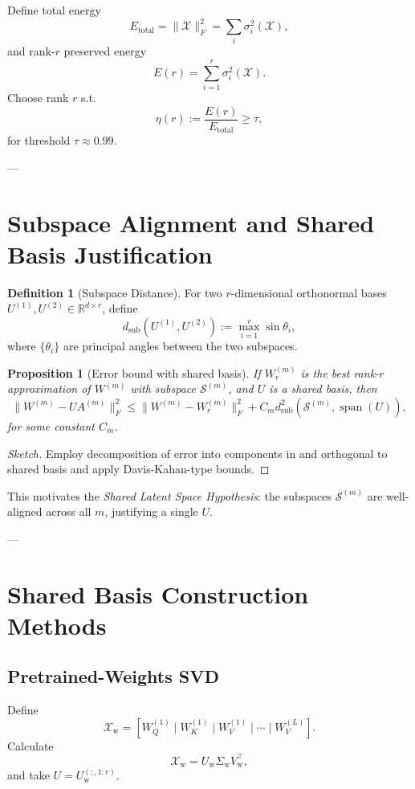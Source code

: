 \documentclass[11pt]{article}
\newtheorem{proposition}[theorem]{Proposition}
\theoremstyle{definition}
\newtheorem{definition}{Definition}[section]
\begin{document}
Define total energy
\[
E_{\text{total}} = \|\mathcal{X}\|_F^2 = \sum_i \sigma_i^2(\mathcal{X}),
\]
and rank-\(r\) preserved energy
\[
E(r) = \sum_{i=1}^r \sigma_i^2(\mathcal{X}).
\]
Choose rank \(r\) s.t.
\[
\eta(r) := \frac{E(r)}{E_{\text{total}}} \ge \tau,
\]
for threshold \(\tau \approx 0.99\).

---

\section{Subspace Alignment and Shared Basis Justification}

\begin{definition}[Subspace Distance]
For two \(r\)-dimensional orthonormal bases \(U^{(1)}, U^{(2)} \in \mathbb{R}^{d \times r}\), define
\[
d_{\mathrm{sub}}(U^{(1)}, U^{(2)}) := \max_{i=1}^r \sin \theta_i,
\]
where \(\{\theta_i\}\) are principal angles between the two subspaces.
\end{definition}

\begin{proposition}[Error bound with shared basis]
If \(W_r^{(m)}\) is the best rank-\(r\) approximation of \(W^{(m)}\) with subspace \(\mathcal{S}^{(m)}\), and \(U\) is a shared basis, then
\[
\|W^{(m)} - U A^{(m)}\|_F^2 \le \| W^{(m)} - W_r^{(m)} \|_F^2 + C_m d_{\mathrm{sub}}^2(\mathcal{S}^{(m)}, \operatorname{span}(U)),
\]
for some constant \(C_m\).
\end{proposition}

\begin{proof}[Sketch]
Employ decomposition of error into components in and orthogonal to shared basis and apply Davis-Kahan-type bounds.
\end{proof}

This motivates the \emph{Shared Latent Space Hypothesis}: the subspaces \(\mathcal{S}^{(m)}\) are well-aligned across all \(m\), justifying a single \(U\).

---

\section{Shared Basis Construction Methods}

\subsection{Pretrained-Weights SVD}

Define
\[
\mathcal{X}_{\text{w}} = \left[ W_Q^{(1)} \mid W_K^{(1)} \mid W_V^{(1)} \mid \cdots \mid W_V^{(L)} \right].
\]
Calculate
\[
\mathcal{X}_{\text{w}} = U_{\text{w}} \Sigma_{\text{w}} V_{\text{w}}^\top,
\]
and take \(U = U_{\text{w}}^{(:,1:r)}\).
\end{document}
